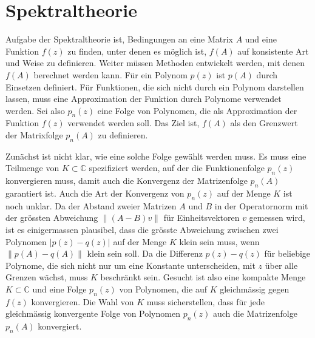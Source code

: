 %
%
% 
\section{Spektraltheorie
\label{buch:section:spektraltheorie}}
Aufgabe der Spektraltheorie ist, Bedingungen an eine Matrix $A$ und eine
Funktion $f(z)$ zu finden, unter denen es möglich ist, $f(A)$ auf 
konsistente Art und Weise zu definieren.
Weiter müssen Methoden entwickelt werden, mit denen $f(A)$ berechnet
werden kann.
Für ein Polynom $p(z)$ ist $p(A)$ durch Einsetzen definiert.
Für Funktionen, die sich nicht durch ein Polynom darstellen lassen,
muss eine Approximation der Funktion durch Polynome verwendet werden.
Sei also $p_n(z)$ eine Folge von Polynomen, die als Approximation der
Funktion $f(z)$ verwendet werden soll.
Das Ziel ist, $f(A)$ als den Grenzwert der Matrixfolge $p_n(A)$
zu definieren.

Zunächst ist nicht klar, wie eine solche Folge gewählt werden muss.
Es muss eine Teilmenge von $K\subset\mathbb{C}$ spezifiziert werden,
auf der die Funktionenfolge $p_n(z)$ konvergieren muss,
damit auch die Konvergenz der Matrizenfolge $p_n(A)$ garantiert ist.
Auch die Art der Konvergenz von $p_n(z)$ auf der Menge $K$ ist noch
unklar.
Da der Abstand zweier Matrizen $A$ und $B$ in der Operatornorm
mit der grössten Abweichung $\|(A-B)v\|$ für Einheitsvektoren $v$
gemessen wird, ist es einigermassen plausibel, dass
die grösste Abweichung zwischen zwei Polynomen $|p(z) - q(z)|$ auf
der Menge $K$ klein sein muss, wenn $\|p(A)-q(A)\|$ klein 
sein soll.
Da die Differenz $p(z)-q(z)$ für beliebige Polynome, die sich nicht
nur um eine Konstante unterscheiden, mit $z$ über alle Grenzen wächst,
muss $K$ beschränkt sein.
Gesucht ist also eine kompakte Menge $K\subset\mathbb{C}$ und eine
Folge $p_n(z)$ von Polynomen, die auf $K$ gleichmässig gegen $f(z)$
konvergieren.
Die Wahl von $K$ muss sicherstellen, dass für jede gleichmässig
konvergente Folge von Polynomen $p_n(z)$ auch die Matrizenfolge
$p_n(A)$ konvergiert.

